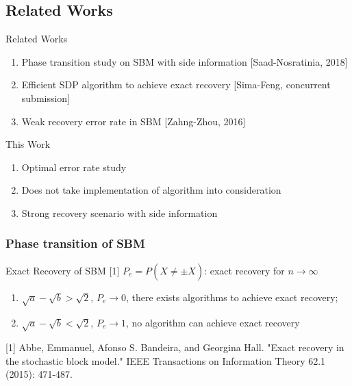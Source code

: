 \documentclass[notheorems]{beamer}
\begin{document}
\subsection{Related Works}
\begin{frame}{Related Works}
	\begin{enumerate}
		\item Phase transition study on SBM with side information
		[Saad-Nosratinia, 2018]
		\item Efficient SDP algorithm to achieve exact recovery
		[Sima-Feng, concurrent submission]
		\item Weak recovery error rate in SBM
		[Zahng-Zhou, 2016]
	\end{enumerate}
	\begin{block}{This Work}
		\begin{enumerate}
			\item Optimal error rate study
			\item Does not take implementation of algorithm into consideration
			\item Strong recovery scenario with side information
		\end{enumerate}
	\end{block}
\end{frame}
\begin{frame}
	\frametitle{Phase transition of SBM}
	\begin{block}{Exact Recovery of SBM [1]}
		$P_e=P(\hat{X} \neq \pm X)$: exact recovery for $n \to \infty$
		\begin{enumerate}
			\item $\sqrt{a} - \sqrt{b} > \sqrt{2}$, $P_e \to 0$, there exists algorithms to achieve exact recovery;
			\item $\sqrt{a} - \sqrt{b} < \sqrt{2}$, $P_e \to 1$, no algorithm can achieve exact recovery
		\end{enumerate}
	\end{block}
	{\scriptsize [1]
	Abbe, Emmanuel, Afonso S. Bandeira, and Georgina Hall. "Exact recovery in the stochastic block model." IEEE Transactions on Information Theory 62.1 (2015): 471-487.
	}
	\end{frame}
	
\end{document}
